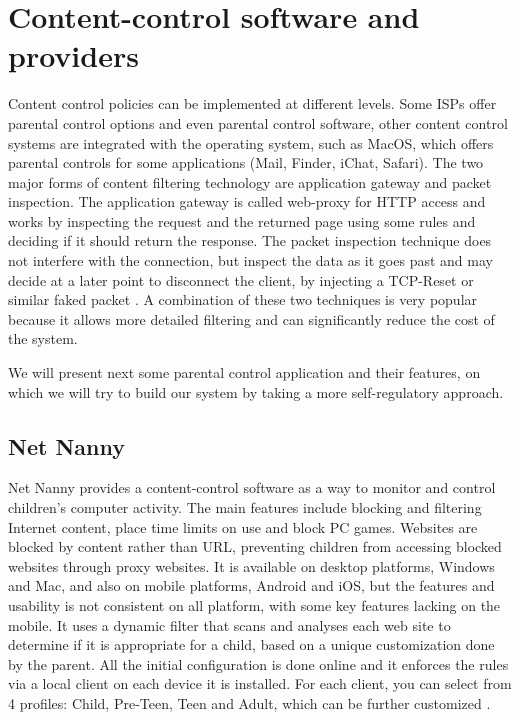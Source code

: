 
\chapter{Content-control software and providers} %

\label{Chapter2} %

Content control policies can be implemented at different levels. Some ISPs offer parental control options and even parental control software, other content control systems are integrated with the operating system, such as MacOS, which offers parental controls for some applications (Mail, Finder, iChat, Safari). The two major forms of content filtering technology are application gateway and packet inspection. The application gateway is called web-proxy for HTTP access and works by inspecting the request and the returned page using some rules and deciding if it should return the response. The packet inspection technique does not interfere with the connection, but inspect the data as it goes past and may decide at a later point to disconnect the client, by injecting a TCP-Reset or similar faked packet \citep{dharmapurikar2003deep}. A combination of these two techniques is very popular because it allows more detailed filtering and can significantly reduce the cost of the system.

We will present next some parental control application and their features, on which we will try to build our system by taking a more self-regulatory approach.

\section{Net Nanny}

Net Nanny provides a content-control software as a way to monitor and control children's computer activity. The main features include blocking and filtering Internet content, place time limits on use and block PC games. Websites are blocked by content rather than URL, preventing children from accessing blocked websites through proxy websites. It is available on desktop platforms, Windows and Mac, and also on mobile platforms, Android and iOS, but the features and usability is not consistent on all platform, with some key features lacking on the mobile. It uses a dynamic filter that scans and analyses each web site to determine if it is appropriate for a child, based on a unique customization done by the parent. All the initial configuration is done online and it enforces the rules via a local client on each device it is installed. For each client, you can select from 4 profiles: Child, Pre-Teen, Teen and Adult, which can be further customized \citep{netNannyFeatures}.

